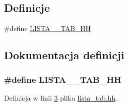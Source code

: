 \subsection*{Definicje}
\begin{DoxyCompactItemize}
\item 
\#define \hyperlink{lista__tab_8hh_aa18bcf5b3ca1bcf8eb83ff54a925b132}{L\-I\-S\-T\-A\-\_\-\-\_\-\-T\-A\-B\-\_\-\-H\-H}
\end{DoxyCompactItemize}


\subsection{Dokumentacja definicji}
\hypertarget{lista__tab_8hh_aa18bcf5b3ca1bcf8eb83ff54a925b132}{
\subsubsection[{L\-I\-S\-T\-A\-\_\-\-\_\-\-T\-A\-B\-\_\-\-H\-H}]{\setlength{\rightskip}{0pt plus 5cm}\#define L\-I\-S\-T\-A\-\_\-\-\_\-\-T\-A\-B\-\_\-\-H\-H}}\label{lista__tab_8hh_aa18bcf5b3ca1bcf8eb83ff54a925b132}


Definicja w linii \hyperlink{lista__tab_8hh_source_l00003}{3} pliku \hyperlink{lista__tab_8hh_source}{lista\-\_\-tab.\-hh}.

